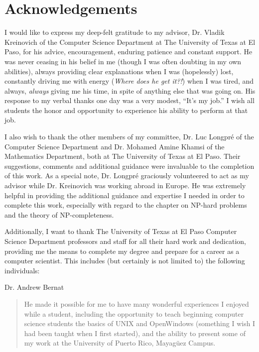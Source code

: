 

\chapter*{Acknowledgements}

I would like to express my deep-felt gratitude to my advisor, Dr. Vladik 
Kreinovich of the Computer Science Department at The University of Texas at El
Paso, for his advice, encouragement, enduring patience and constant support.
He was never ceasing in his belief in me (though I was often doubting in my 
own abilities), always providing clear explanations when I was (hopelessly) 
lost, constantly driving me with energy ({\it Where does he get it?!\/}) when 
I was tired, and always, {\em always\/} giving me his time, in spite of 
anything else that was going on.  His response to my verbal thanks one day was 
a very modest, ``It's my job.''  I wish all students the honor and opportunity 
to experience his ability to perform at that job.

I also wish to thank the other members of my committee, Dr. Luc Longpr\'{e} of 
the Computer Science Department and Dr. Mohamed Amine Khamsi of the Mathematics 
Department, both at The University of Texas at El Paso.  Their suggestions, 
comments and additional guidance were invaluable to the completion of this work.
As a special note, Dr. Longpr\'{e} graciously volunteered to act as my advisor
while Dr. Kreinovich was working abroad in Europe.  He was extremely helpful in 
providing the additional guidance and expertise I needed in order to complete 
this work, especially with regard to the chapter on NP-hard problems and the 
theory of NP-completeness.

\newpage
Additionally, I want to thank The University of Texas at El Paso Computer 
Science Department professors and staff for all their hard work and dedication,
providing me the means to complete my degree and prepare for a career as a 
computer scientist. This includes (but certainly is not limited to) the 
following individuals:

\bigskip

\noindent
Dr. Andrew Bernat
\begin{quote}
  He made it possible for me to have many wonderful experiences I enjoyed 
  while a student, including the opportunity to teach beginning computer 
  science students the basics of UNIX and OpenWindows (something I wish I 
  had been taught when I first started), and the ability to present some 
  of my work at the University of Puerto Rico, Mayag\"{u}ez Campus.
\end{quote}

